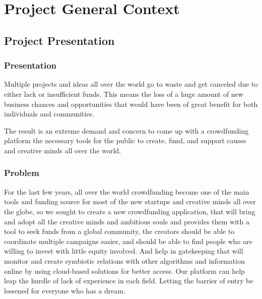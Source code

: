 

\setcounter{mtc}{9}
\chapter{Project General Context }%
\label{chap:chapter_one}
\minitoc
\section{ Project Presentation }
\subsection{Presentation}
Multiple projects and ideas all over the world go to waste and get canceled due to either lack or insufficient funds.
This means the loss of a huge amount of new business chances and opportunities that would have been of great benefit for both individuals and communities.

The result is an extreme demand and concern to come up with a crowdfunding platform the necessary tools for the public to create, fund, and support causes and creative minds all over the world.



\subsection{Problem}

For the last few years, all over the world crowdfunding become one of the main tools and funding source for most of the new startups and creative minds all over the globe,
so we sought to create a new crowdfunding application, that will bring and adopt all the creative minds and ambitious souls and provides them with a tool to seek funds from a global community,
the creators should be able to coordinate multiple campaigns easier, and should be able to find people who are willing to invest with little equity involved. And help in gatekeeping that will monitor and create symbiotic relations with other algorithms and information online by using cloud-based solutions for better access.
Our platform can help leap the hurdle of lack of experience in each field. Letting the barrier of entry be lessened for everyone who has a dream.

